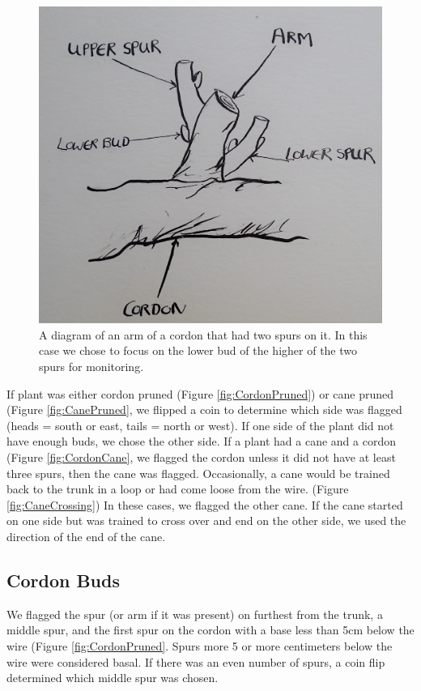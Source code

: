 \documentclass[11pt,letter]{article}
\begin{document}
\begin{figure}
  \includegraphics[width=\linewidth]{TwoSpurs.jpg}
  \caption{A diagram of an arm of a cordon that had two spurs on it. In this case we chose to focus on the lower bud of the higher of the two spurs for monitoring.}
  \label{fig:TwoSpurs}
\end{figure}



If plant was either cordon pruned (Figure \ref{fig:CordonPruned}) or cane pruned (Figure \ref{fig:CanePruned}, we flipped a coin to determine which side was flagged (heads = south or east, tails = north or west). If one side of the plant did not have enough buds, we chose the other side. If a plant had a cane and a cordon (Figure \ref{fig:CordonCane}, we flagged the cordon unless it did not have at least three spurs, then the cane was flagged. Occasionally, a cane would be trained back to the trunk in a loop or had come loose from the wire. (Figure \ref{fig:CaneCrossing}) In these cases, we flagged the other cane. If the cane started on one side but was trained to cross over and end on the other side, we used the direction of the end of the cane. 


\subsection{Cordon Buds}

We flagged the spur (or arm if it was present) on furthest from the trunk, a middle spur, and the first spur on the cordon with a base less than 5cm below the wire (Figure \ref{fig:CordonPruned}. Spurs more 5 or more centimeters below the wire were considered basal. If there was an even number of spurs, a coin flip determined which middle spur was chosen.
\end{document}
